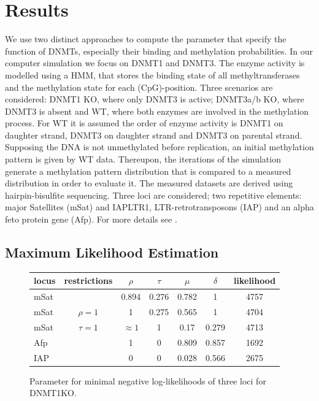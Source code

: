 \chapter{Results}
\label{chapter:results}
We use two distinct approaches to compute the parameter that specify the function of \acfp{DNMT}, especially their binding and methylation probabilities. In our computer simulation we focus on DNMT1 and DNMT3. The enzyme activity is modelled using a \acf{HMM}, that stores the binding state of all methyltransferases and the methylation state for each (\acf{CpG})-position. Three scenarios are considered: DNMT1 \acf{KO}, where only DNMT3 is active; DNMT3a/b \ac{KO}, where DNMT3 is absent and \acf{WT}, where both enzymes are involved in the methylation process. For \ac{WT} it is assumed the order of enzyme activity is DNMT1 on daughter strand, DNMT3 on daughter strand and DNMT3 on parental strand. Supposing the DNA is not unmethylated before replication, an initial methylation pattern is given by \ac{WT} data. Thereupon, the iterations of the simulation generate a methylation pattern distribution that is compared to a measured distribution in order to evaluate it.\newline
The measured datasets are derived using hairpin-bisulfite sequencing. Three loci are considered; two repetitive elements: major Satellites (mSat) and IAPLTR1, LTR-retrotransposons (IAP) and an alpha feto protein gene (Afp). For more details see \cite{Wolf}.

\section{Maximum Likelihood Estimation}
\label{MLE}
\begin{figure}[h]
\begin{center}
\begin{tabularx}{\textwidth}{l|c|c|c|c|c|c}
locus&	restrictions&	$\rho$&	$\tau$&	$\mu$&	$\delta$&	likelihood\\
\hline
mSat&	&	0.894&	0.276&	0.782&	1&	4757\\
mSat&	$\rho=1$&	1&	0.275&	0.565&	1&	4704\\
mSat&	$\tau=1$&	$\approx1$&	1&	0.17&	0.279&	4713\\
Afp&	&	1&	0&	0.809&	0.857&	1692\\
IAP&	&	0&	0&	0.028&	0.566&	2675\\
\end{tabularx}
\end{center}
\label{DNMT1KO}
\caption{Parameter for minimal negative log-likelihoods of three loci for DNMT1KO.}
\end{figure}

